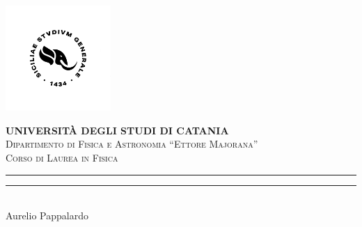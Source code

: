 \newcommand{\unictsize}{0.3\textwidth}
\newcommand{\dfasize}{0.6\textwidth}
\newcommand{\namesize}{0.8\textwidth}
\newcommand{\doublerule}{\hrule \vspace{5pt} \hrule}

\begin{titlingpage}
    \begin{center}
        \begin{minipage}[h!]{\linewidth}
            \begin{minipage}[ht!]{\linewidth}
                \centering
                \includegraphics[width=\unictsize]{images/title/UniCT-Logo-Nero-quadrato.png}
            \end{minipage}
            \centering\large
            \textbf{UNIVERSITÀ DEGLI STUDI DI CATANIA}
            \\[5pt]
            \normalsize
            \textsc{Dipartimento di Fisica e Astronomia ``Ettore Majorana''}
            \\[5pt]
            \textsc{Corso di Laurea in Fisica}
            \\[10pt]
            \doublerule
        \end{minipage}
        \\[50pt]
        \vspace{\fill}
        {\normalfont\large{Aurelio Pappalardo}}

\end{center}
\end{titlingpage}
